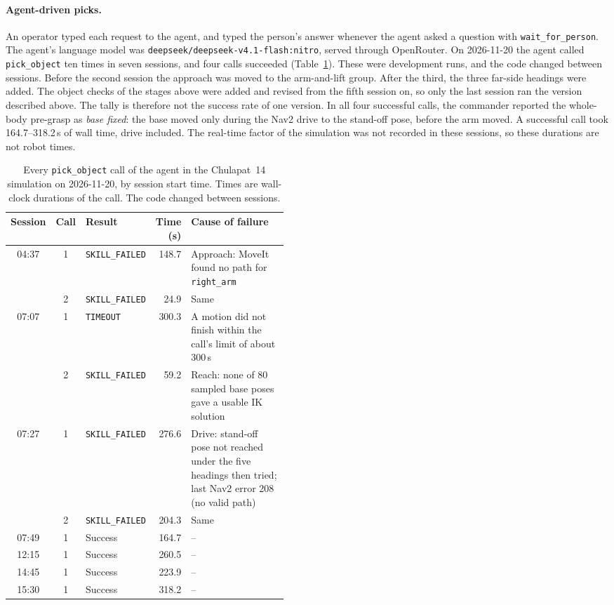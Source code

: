 \documentclass[12pt,a4paper]{article}
\begin{document}
\paragraph{Agent-driven picks.}
An operator typed each request to the agent, and typed the person's answer whenever the agent asked a
question with \texttt{wait\_for\_person}. The agent's language model was
\texttt{deepseek/}\allowbreak\texttt{deepseek-v4.1-flash:nitro}, served through OpenRouter. On 2026-11-20 the agent called \texttt{pick\_object} ten times
in seven sessions, and four calls succeeded (Table~\ref{tab:pick_agent}). These were development runs,
and the code changed between sessions. Before the second session the approach was moved to the
arm-and-lift group. After the third, the three far-side headings were added. The object checks of the
stages above were added and revised from the fifth session on, so only the last session ran the
version described above. The tally is therefore not the success rate of one version. In all four
successful calls, the commander reported the whole-body pre-grasp as \emph{base fixed}: the base moved
only during the Nav2 drive to the stand-off pose, before the arm moved. A successful call took
164.7--318.2\,s of wall time, drive included. The real-time factor of the simulation was not recorded
in these sessions, so these durations are not robot times.

\begin{table}[H]
    \centering
    \small
    \renewcommand{\arraystretch}{1.15}
    \begin{tabular}{c c l r p{0.46\linewidth}}
        \toprule
        Session & Call & Result & Time (s) & Cause of failure \\
        \midrule
        04:37 & 1 & \texttt{SKILL\_FAILED} & 148.7 & Approach: MoveIt found no path for \texttt{right\_arm} \\
              & 2 & \texttt{SKILL\_FAILED} &  24.9 & Same \\
        07:07 & 1 & \texttt{TIMEOUT}       & 300.3 & A motion did not finish within the call's limit of about 300\,s \\
              & 2 & \texttt{SKILL\_FAILED} &  59.2 & Reach: none of 80 sampled base poses gave a usable IK solution \\
        07:27 & 1 & \texttt{SKILL\_FAILED} & 276.6 & Drive: stand-off pose not reached under the five headings then tried; last Nav2 error 208 (no valid path) \\
              & 2 & \texttt{SKILL\_FAILED} & 204.3 & Same \\
        07:49 & 1 & Success & 164.7 & -- \\
        12:15 & 1 & Success & 260.5 & -- \\
        14:45 & 1 & Success & 223.9 & -- \\
        15:30 & 1 & Success & 318.2 & -- \\
        \bottomrule
    \end{tabular}
    \caption{\small{Every \texttt{pick\_object} call of the agent in the Chulapat~14 simulation on
    2026-11-20, by session start time. Times are wall-clock durations of the call. The code changed
    between sessions.}}
    \label{tab:pick_agent}
\end{table}
\end{document}
